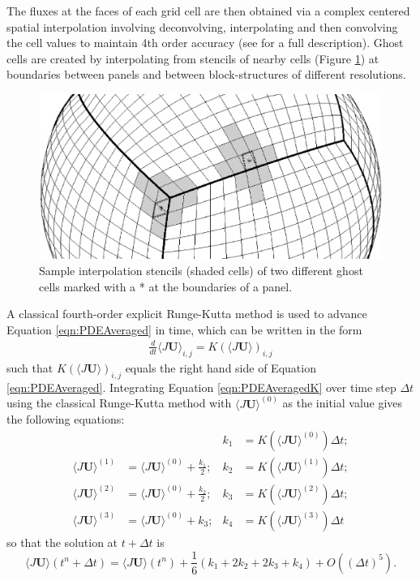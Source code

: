    The fluxes at the faces of each grid cell are then obtained via a complex centered spatial interpolation involving deconvolving, interpolating and then convolving the cell values to maintain 4th order accuracy (see \cite{McCorquodale:2014rw} for a full description).  Ghost cells are created by interpolating from stencils of nearby cells (Figure \ref{fig:ghostcellstens}) at boundaries between panels and between block-structures of different resolutions.  
   \begin{figure}[h]
   \centerline{ \includegraphics[width=.7\textwidth]{ModelDescription/CSstencilUniform} }
   \caption{Sample interpolation stencils (shaded cells) of two different ghost cells marked with a * at the boundaries of a panel.}
   \label{fig:ghostcellstens}
   \end{figure}
   
   A classical fourth-order explicit Runge-Kutta method is used to advance Equation \ref{eqn:PDEAveraged} in time, which can be written in the form
   \begin{align}
      \frac{d}{dt} \langle J \mathbf{U} \rangle_{i,j}
       = K ( \langle J \mathbf{U} \rangle )_{i,j}
       \label{eqn:PDEAveragedK}
   \end{align}
   such that $K\left(\langle J\mathbf{U} \rangle\right)_{i,j}$ equals the right hand side of Equation \ref{eqn:PDEAveraged}.  Integrating Equation \ref{eqn:PDEAveragedK} over time step $\Delta t$  using the classical Runge-Kutta method with $\langle J \mathbf{U} \rangle^{(0)}$ as the initial value gives the following equations:
   \begin{align}
      & & k_1 & = K(\langle J \mathbf{U} \rangle^{(0)} ) \Delta t; \label{eqn:k1} \\
      \langle J \mathbf{U} \rangle^{(1)} & = \langle J \mathbf{U} \rangle^{(0)} + \frac{k_1}{2} ; &
      k_2 & =   K(\langle J \mathbf{U} \rangle^{(1)} ) \Delta t; \label{eqn:k2} \\ 
      \langle J \mathbf{U} \rangle^{(2)} & = \langle J \mathbf{U} \rangle^{(0)} + \frac{k_2}{2} ; &
      k_3 & =  K(\langle J \mathbf{U} \rangle^{(2)} ) \Delta t; \label{eqn:k3} \\
      \langle J \mathbf{U} \rangle^{(3)} & = \langle J \mathbf{U} \rangle^{(0)} + k_3 ; &
       k_4 & = K(\langle J \mathbf{U} \rangle^{(3)} ) \Delta t \label{eqn:k4} 
    \end{align}
    so that the solution at $t+\Delta t$ is
    \begin{equation}
        \langle J \mathbf{U} \rangle(t^n + \Delta t) = 
        \langle J \mathbf{U} \rangle(t^n) + \frac{1}{6} (k_1 + 2 k_2 + 2 k_3 + k_4) +
        O((\Delta t)^5).
    \end{equation}
    
